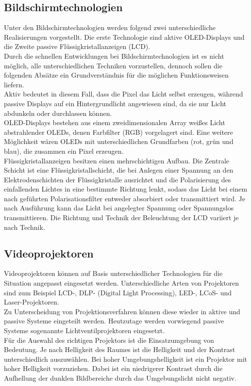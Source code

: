 \subsection{Bildschirmtechnologien}
Unter den Bildschirmtechnologien werden folgend zwei unterschiedliche Realisierungen vorgestellt. Die erste Technologie sind aktive OLED-Displays und die Zweite passive Flüssigkristallanzeigen (LCD). \\
Durch die schnellen Entwicklungen bei Bildschirmtechnologien ist es nicht möglich, alle unterschiedlichen Techniken vorzustellen, dennoch sollen die folgenden Absätze ein Grundverständnis für die möglichen Funktionsweisen liefern.\\
Aktiv bedeutet in diesem Fall, dass die Pixel das Licht selbst erzeugen, während passive Displays auf ein Hintergrundlicht angewiesen sind, da sie nur Licht abdunkeln oder durchlassen können. \\
\glqq OLED-Displays bestehen aus einem zweidimensionalen Array weißes Licht abstrahlender OLEDs, denen Farbfilter (RGB) vorgelagert sind.\grqq \cite[Seite 347]{LofflerMang.2020} Eine weitere Möglichkeit wären OLEDs mit unterschiedlichen Grundfarben (rot, grün und blau), die zusammen ein Pixel erzeugen. \\
Flüssigkristallanzeigen besitzen einen mehrschichtigen Aufbau. Die Zentrale Schicht ist eine Flüssigkristallschicht, die bei Anlegen einer Spannung an den Elektrodenschichten der Flüssigkristalle ausrichtet und die Polarisierung des einfallenden Lichtes in eine bestimmte Richtung lenkt, sodass das Licht bei einem nach geführten Polarisationsfilter entweder absorbiert oder transmittiert wird. \cite[][Vgl. Seite 346 f.]{LofflerMang.2020} Je nach Ausführung kann das Licht bei angelegter Spannung oder Spannungslos transmittieren. Die Richtung und Technik der Beleuchtung der LCD variiert je nach Technik.
\subsection{Videoprojektoren}
Videoprojektoren können auf Basis unterschiedlicher Technologien für die Situation angepasst eingesetzt werden. Unterschiedliche Arten von Projektoren sind zum Beispiel LCD-, DLP- (Digital Light Processing), LED-, LCoS- und Laser-Projektoren. \\
Zu Unterscheidung von Projektionsverfahren können diese wieder in aktive und passive Systeme eingeteilt werden. Heutzutage werden vorwiegend passive Systeme sogenannte Lichtventilprojektoren eingesetzt. \cite[Vgl. Seite 551]{Schmidt.2021} \\
Für die Auswahl des richtigen Projektors ist die Einsatzumgebung von Bedeutung. Je nach Helligkeit des Raumes ist die Helligkeit und der Kontrast unterschiedlich auszuwählen. Bei hoher Umgebungshelligkeit ist ein Projektor mit hoher Helligkeit vorzuziehen. Dabei ist ein niedrigerer Kontrast durch die Aufhellung der dunklen Bildbereiche durch das Umgebungslicht nicht negativ. \cite[Vgl. Seite 562]{Schmidt.2021}
